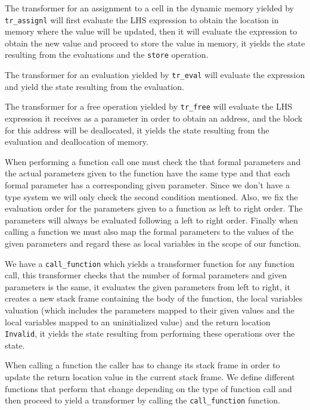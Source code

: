 The transformer for an assignment to a cell in the dynamic memory yielded by \verb|tr_assignl| will first evaluate the LHS expression to obtain the location in memory where the value will be updated, then it will evaluate the expression to obtain the new value and proceed to store the value in memory, it yields the state resulting from the evaluations and the \verb|store| operation.

The transformer for an evaluation yielded by \verb|tr_eval| will evaluate the expression and yield the state resulting from the evaluation.

The transformer for a free operation yielded by \verb|tr_free| will evaluate the LHS expression it receives as a parameter in order to obtain an address, and the block for this address will be deallocated, it yields the state resulting from the evaluation and deallocation of memory.

When performing a function call one must check the that formal parameters and the actual parameters given to the function have the same type and that each formal parameter has a corresponding given parameter.
Since we don't have a type system we will only check the second condition mentioned.
Also, we fix the evaluation order for the parameters given to a function as left to right order.
The parameters will always be evaluated following a left to right order.
Finally when calling a function we must also map the formal parameters to the values of the given parameters and regard these as local variables in the scope of our function.

We have a \verb|call_function| which yields a transformer function for any function call, this transformer checks that the number of formal parameters and given parameters is the same, it evaluates the given parameters from left to right, it creates a new stack frame containing the body of the function, the local variables valuation (which includes the parameters mapped to their given values and the local variables mapped to an uninitialized value) and the return location \verb|Invalid|, it yields the state resulting from performing these operations over the state.

When calling a function the caller has to change its stack frame in order to update the return location value in the current stack frame.
We define different functions that perform that change depending on the type of function call and then proceed to yield a transformer by calling the \verb|call_function| function.

\begin{comment}
I should also explain here why function calls always return to a dummy variable, right?
\end{comment}

